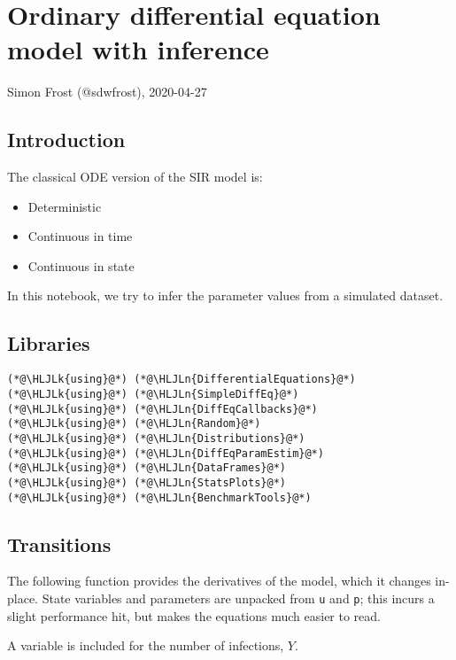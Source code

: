 \documentclass[12pt,a4paper]{article}
\newcommand{\HLJLk}[1]{\textcolor[RGB]{148,91,176}{\textbf{#1}}}
\newcommand{\HLJLn}[1]{#1}
\begin{document}
\section{Ordinary differential equation model with inference}
Simon Frost (@sdwfrost), 2020-04-27

\subsection{Introduction}
The classical ODE version of the SIR model is:

\begin{itemize}
\item Deterministic


\item Continuous in time


\item Continuous in state

\end{itemize}
In this notebook, we try to infer the parameter values from a simulated dataset.

\subsection{Libraries}

\begin{lstlisting}
(*@\HLJLk{using}@*) (*@\HLJLn{DifferentialEquations}@*)
(*@\HLJLk{using}@*) (*@\HLJLn{SimpleDiffEq}@*)
(*@\HLJLk{using}@*) (*@\HLJLn{DiffEqCallbacks}@*)
(*@\HLJLk{using}@*) (*@\HLJLn{Random}@*)
(*@\HLJLk{using}@*) (*@\HLJLn{Distributions}@*)
(*@\HLJLk{using}@*) (*@\HLJLn{DiffEqParamEstim}@*)
(*@\HLJLk{using}@*) (*@\HLJLn{DataFrames}@*)
(*@\HLJLk{using}@*) (*@\HLJLn{StatsPlots}@*)
(*@\HLJLk{using}@*) (*@\HLJLn{BenchmarkTools}@*)
\end{lstlisting}


\subsection{Transitions}
The following function provides the derivatives of the model, which it changes in-place. State variables and parameters are unpacked from \texttt{u} and \texttt{p}; this incurs a slight performance hit, but makes the equations much easier to read.

A variable is included for the number of infections, $Y$.
\end{document}
